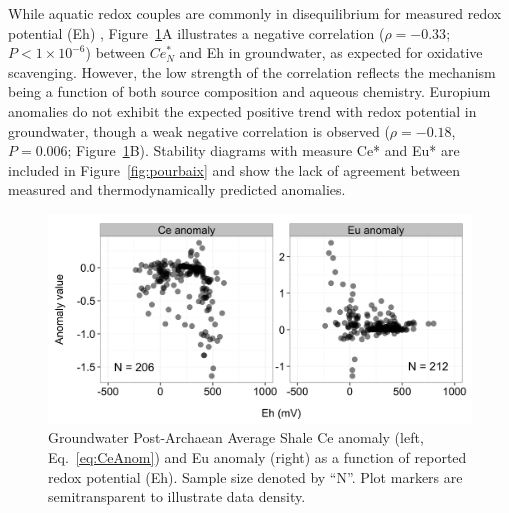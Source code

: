 While aquatic redox couples are commonly in disequilibrium for measured redox potential (Eh) \citep{Linberg_Sci_1984}, Figure~\ref{fig:anom_vs_Eh}A illustrates a negative correlation ($\rho=-0.33$; $P<1\times10^{-6}$) between $Ce_N^*$ and Eh in groundwater, as expected for oxidative scavenging.
However, the low strength of the correlation reflects the mechanism being a function of both source composition and aqueous chemistry.
Europium anomalies do not exhibit the expected positive trend with redox potential in groundwater, though a weak negative correlation is observed ($\rho= -0.18$, $P = 0.006$; Figure~\ref{fig:anom_vs_Eh}B).
Stability diagrams with measure Ce* and Eu* are included in Figure~\ref{fig:pourbaix} and show the lack of agreement between measured and thermodynamically predicted anomalies.

\begin{figure}[htbp]
\begin{center}
\includegraphics[width=\textwidth]{Ch3_figures/GW-elem-anom-vs-Eh_2015-10-14}
\caption{Groundwater Post-Archaean Average Shale Ce anomaly (left, Eq.~\ref{eq:CeAnom}) and Eu anomaly (right) as a function of reported redox potential (Eh).
Sample size denoted by ``N''. Plot markers are semitransparent to illustrate data density.}\label{fig:anom_vs_Eh}
\end{center}
\end{figure}

